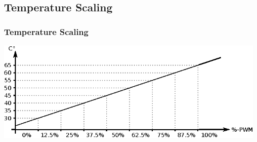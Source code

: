 \documentclass[mathserif]{beamer}
\begin{document}
\begin{frame}
	\section{Temperature Scaling}
	\frametitle{Temperature Scaling}
	\includegraphics[width=\linewidth]{graphics/tempscale.eps}
\end{frame}
\end{document}
